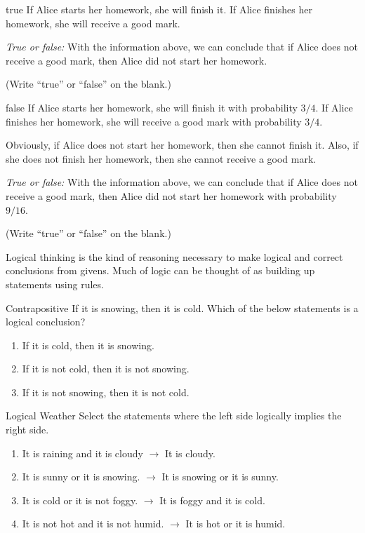 \documentclass[a4paper,10pt]{report}
\begin{document}
\begin{problem}{true}
  If Alice starts her homework, she will finish it. If Alice finishes her homework, she will
  receive a good mark.

  \textit{True or false:}
  With the information above, we can conclude that if Alice does not receive a good mark,
  then Alice did not start her homework.

  (Write ``true'' or ``false'' on the blank.)
\end{problem}

\begin{problem}{false}
  If Alice starts her homework, she will finish it with probability \(3/4\). If Alice
  finishes her homework, she will receive a good mark with probability \(3/4\).

  Obviously, if Alice does not start her homework, then she cannot finish it. Also, if she
  does not finish her homework, then she cannot receive a good mark.

  \textit{True or false:}
  With the information above, we can conclude that if Alice does not receive a good mark,
  then Alice did not start her homework with probability \(9/16\).

  (Write ``true'' or ``false'' on the blank.)
\end{problem}


Logical thinking is the kind of reasoning necessary to make logical and correct
conclusions from givens. Much of logic can be thought of as building up
statements using rules.

\begin{problem}{Contrapositive}
If it is snowing, then it is cold. Which of the below statements is a logical
conclusion?

\begin{enumerate}[\hspace{.5cm}a.]
\item If it is cold, then it is snowing.
\item If it is not cold, then it is not snowing.
\item If it is not snowing, then it is not cold.
\end{enumerate}
\end{problem}

\begin{problem}{Logical Weather}
Select the statements where the left side logically implies the right side.

\begin{enumerate}[\hspace{.5cm}a.]
\item It is raining and it is cloudy $\to$ It is cloudy.
\item It is sunny or it is snowing. $\to$ It is snowing or it is sunny.
\item It is cold or it is not foggy. $\to$ It is foggy and it is cold.
\item It is not hot and it is not humid. $\to$ It is hot or it is humid.
\end{enumerate}
\end{problem}
\end{document}
